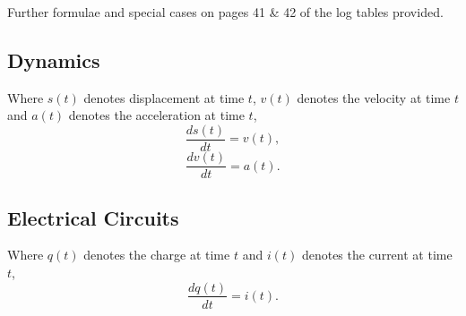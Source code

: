 \documentclass[a4paper,12pt]{article}
\begin{document}
	Further formulae and special cases on pages 41 \& 42 of the log tables provided.

\subsection*{Dynamics}
Where $s(t)$ denotes displacement at time $t$, $v(t)$ denotes the velocity at time $t$ and $a(t)$
denotes the acceleration at time $t$, 
\[  \frac{ds(t)}{dt}  = v(t),\]
\[  \frac{dv(t)}{dt}  = a(t).\]

\subsection*{Electrical Circuits}
Where $q(t)$ denotes the charge at time $t$ and $i(t)$ denotes the current at time $t$,
\[  \frac{dq(t)}{dt}  = i(t).\]
\end{document}
